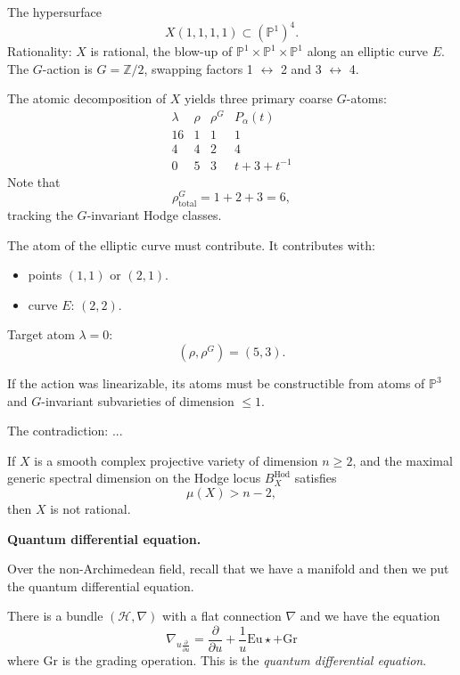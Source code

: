 \begin{example}
The hypersurface
$$
X(1,1,1,1)\subset(\mathbb{P}^1)^4.
$$
Rationality:
$X$ is rational, the blow-up of
$\mathbb{P}^1\times\mathbb{P}^1
\times\mathbb{P}^1$
along an elliptic curve $E$.
The $G$-action is
$G=\mathbb{Z}/2$, swapping factors
1 $\leftrightarrow$ 2 and
3 $\leftrightarrow$ 4.

The atomic decomposition of $X$
yields three primary coarse
$G$-atoms:
$$
\begin{array}{c|c|c|c}
\lambda & \rho & \rho^G & P_\alpha(t)\\
16 & 1 & 1 & 1\\
4 & 4 & 2 & 4\\
0 & 5 & 3 & t+3+t^{-1}
\end{array}
$$
Note that
$$
\rho_{\mathrm{total}}^G=1+2+3=6,
$$
tracking the $G$-invariant Hodge
classes.

The atom of the elliptic curve
must contribute.
It contributes with:
\begin{itemize}
\item points $(1,1)$ or $(2,1)$.
\item curve $E$:
$(2,2)$.
\end{itemize}

\end{example}

Target atom $\lambda=0$:
$$
(\rho,\rho^G)=(5,3).
$$

If the action was linearizable,
its atoms must be constructible
from atoms of $\mathbb{P}^3$ and
$G$-invariant subvarieties of
dimension $\leq 1$.

The contradiction:
...

\begin{theorem}
\label{theorem-x-smooth}
If $X$ is a smooth complex
projective variety of dimension
$n\geq 2$, and the maximal generic
spectral dimension on the Hodge
locus $B_X^{\operatorname{Hod}}$
satisfies
$$
\mu(X)>n-2,
$$
then $X$ is not rational.
\end{theorem}

\medskip\noindent
{\bf Quantum differential equation.}

Over the non-Archimedean field,
recall that we have a manifold and
then we put the quantum
differential equation.

There is a bundle $(\mathcal{H},\nabla)$
with a flat connection $\nabla$
and we have the equation
$$
\nabla_{u \frac{\partial }{\partial u}}
=\frac{\partial }{\partial u}
+ \frac{1}{u} \text{Eu}\star +
\text{Gr}
$$
where $\text{Gr}$ is the grading operation.
This is the {\it quantum differential
equation}.

